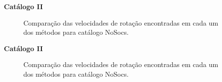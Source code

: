 \documentclass[xcolor=dvipsnames,10pt]{beamer}
\begin{document}
\begin{frame}{\textbf{Catálogo II}}
  \begin{figure}[!htbp] %
  \vspace{-2pt}
  \begin{center}
  \caption{Comparação das velocidades de rotação encontradas em cada um dos métodos para catálogo NoSocs.}
  \end{center}
  \end{figure}
\end{frame}

\begin{frame}{\textbf{Catálogo II}}
  \begin{figure}[!htbp] %
  \vspace{-2pt}
  \begin{center}
  \caption{Comparação das velocidades de rotação encontradas em cada um dos métodos para catálogo NoSocs.}
  \end{center}
  \end{figure}
\end{frame}
\end{document}

